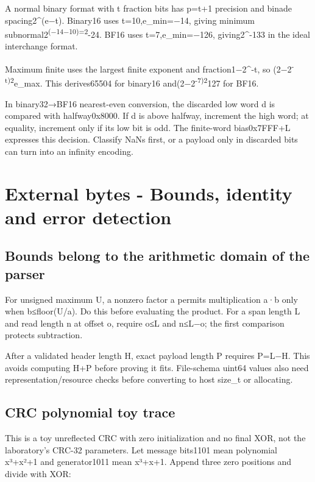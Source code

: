 A normal binary format with t fraction bits has p=t+1 precision and binade spacing2\^{}(e−t). Binary16 uses t=10,e\_min=−14, giving minimum subnormal2\textsuperscript{(−14−10)=2}-24. BF16 uses t=7,e\_min=−126, giving2\^{}-133 in the ideal interchange format.

Maximum finite uses the largest finite exponent and fraction1−2\^{}-t, so (2−2\textsuperscript{-t)2}e\_max. This derives65504 for binary16 and(2−2\textsuperscript{-7)2}127 for BF16.

In binary32→BF16 nearest-even conversion, the discarded low word d is compared with halfway0x8000. If d is above halfway, increment the high word; at equality, increment only if its low bit is odd. The finite-word bias0x7FFF+L expresses this decision. Classify NaNs first, or a payload only in discarded bits can turn into an infinity encoding.

\section{External bytes - Bounds, identity and error detection}\label{01-foundations-i-ch011-external-bytes---bounds-identity-and-error-detection}

\subsection{Bounds belong to the arithmetic domain of the parser}\label{01-foundations-i-ch011-bounds-belong-to-the-arithmetic-domain-of-the-parser}

For unsigned maximum U, a nonzero factor a permits multiplication a·b only when b≤floor(U/a). Do this before evaluating the product. For a span length L and read length n at offset o, require o≤L and n≤L−o; the first comparison protects subtraction.

After a validated header length H, exact payload length P requires P=L−H. This avoids computing H+P before proving it fits. File-schema uint64 values also need representation/resource checks before converting to host size\_t or allocating.

\subsection{CRC polynomial toy trace}\label{01-foundations-i-ch011-crc-polynomial-toy-trace}

This is a toy unreflected CRC with zero initialization and no final XOR, not the laboratory's CRC-32 parameters. Let message bits1101 mean polynomial x³+x²+1 and generator1011 mean x³+x+1. Append three zero positions and divide with XOR:

